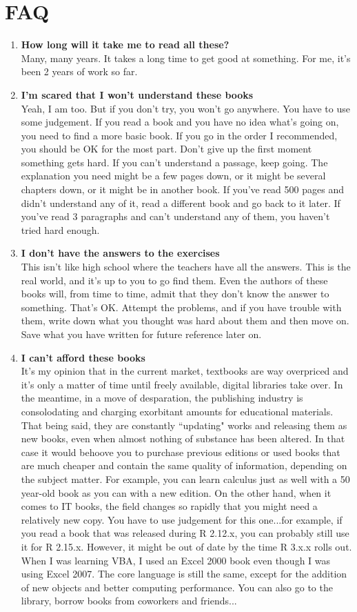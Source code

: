 \documentclass[oneside, titlepage]{article}
\begin{document}
\section{FAQ}
\begin{enumerate}
\item{\bfseries How long will it take me to read all these?}\\
Many, many years. It takes a long time to get good at something. For me, it's been 2 years of work so far.
\item{\bfseries I'm scared that I won't understand these books}\\
Yeah, I am too. But if you don't try, you won't go anywhere. You have to use some judgement. If you read a book and you have no idea what's going on, you need to find a more basic book. If you go in the order I recommended, you should be OK for the most part. Don't give up the first moment something gets hard. If you can't understand a passage, keep going. The explanation you need might be a few pages down, or it might be several chapters down, or it might be in another book. If you've read 500 pages and didn't understand any of it, read a different book and go back to it later. If you've read 3 paragraphs and can't understand any of them, you haven't tried hard enough.
\item{\bfseries I don't have the answers to the exercises}\\
This isn't like high school where the teachers have all the answers. This is the real world, and it's up to you to go find them. Even the authors of these books will, from time to time, admit that they don't know the answer to something. That's OK. Attempt the problems, and if you have trouble with them, write down what you thought was hard about them and then move on. Save what you have written for future reference later on.
\item{\bfseries I can't afford these books}\\
It's my opinion that in the current market, textbooks are way overpriced and it's only a matter of time until freely available, digital libraries take over. In the meantime, in a move of desparation, the publishing industry is consolodating and charging exorbitant amounts for educational materials. That being said, they are constantly ``updating" works and releasing them as new books, even when almost nothing of substance has been altered. In that case it would behoove you to purchase previous editions or used books that are much cheaper and contain the same quality of information, depending on the subject matter. For example, you can learn calculus just as well with a 50 year-old book as you can with a new edition. On the other hand, when it comes to IT books, the field changes so rapidly that you might need a relatively new copy. You have to use judgement for this one...for example, if you read a book that was released during R 2.12.x, you can probably still use it for R 2.15.x. However, it might be out of date by the time R 3.x.x rolls out. When I was learning VBA, I used an Excel 2000 book even though I was using Excel 2007. The core language is still the same, except for the addition of new objects and better computing performance. You can also go to the library, borrow books from coworkers and friends...

\end{enumerate}
\end{document}
